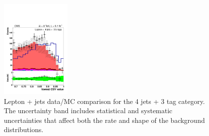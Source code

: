 \begin{figure}[hbtp]
\begin{center}
   \includegraphics[width=0.31\textwidth]{Figures/Analysis_1_Diagrams/d2MCPlots_lowest_btag_cut4_j4_t3_Combined_HtWgt.pdf}
   \hspace{0.055\textwidth}
   \caption{Lepton + jets data/MC comparison for the 4 jets + 3 tag category.  The uncertainty band includes statistical and systematic uncertainties that affect both the rate and shape of the background distributions.}
   \label{fig:lj_input_4j_3t_part2}
 \end{center}
\end{figure}

%
%

\clearpage

